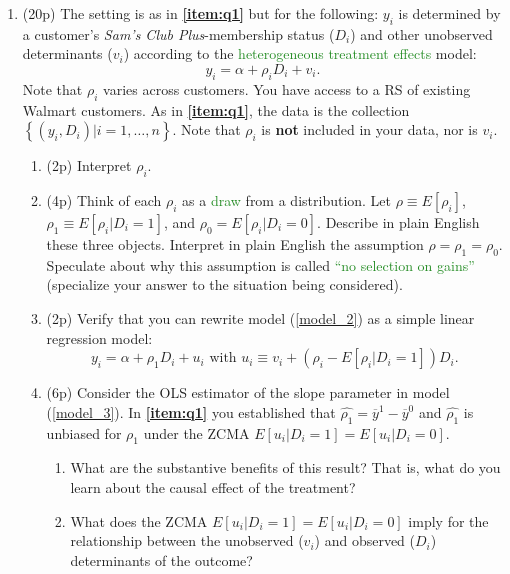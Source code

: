 \documentclass{article}
\begin{document}
\begin{enumerate}[label=\textbf{Q\arabic{enumi}}.,ref=Q\arabic{enumi}, wide=0pt, itemsep=1em, topsep=5pt]
    \item (20p) The setting is as in \textbf{\ref{item:q1}} but for the following: $y_{i}$ is determined by a customer's \textit{Sam's Club Plus}-membership status ($D_{i}$) and other unobserved determinants ($v _{i}$) according to the \textcolor{ForestGreen}{heterogeneous treatment effects} model: \label{item:q3}
    \begin{equation}\label{model_2}
    y_{i}=\alpha +\rho _{i}D_{i}+v_{i}. 
    \end{equation}
Note that $\rho _{i}$ varies across customers. You have access to a RS of existing Walmart customers. As in \textbf{\ref{item:q1}}, the data is the collection $\left\{ \left( y_{i},D_{i}\right) |i=1,\ldots,n\right\} $. Note that $\rho _{i}$ is \textbf{not} included in your data, nor is $v_i$.

    \begin{enumerate}
        \item (2p) Interpret $\rho _{i}$.
        \item (4p) Think of each $\rho _{i}$ as a \textcolor{ForestGreen}{draw} from a distribution. Let $\rho \equiv E\left[ \rho _{i}\right] $, $\rho_1 \equiv E\left[ \rho _{i}|D_{i}=1\right]$, and $\rho_0 = E\left[ \rho _{i}|D_{i}=0\right]$. Describe in plain English these three objects. Interpret in plain English the assumption $\rho=\rho_1=\rho_0 $. Speculate about why this assumption is called \textcolor{ForestGreen}{``no selection on gains''} (specialize your answer to the situation being considered).\label{item:q3-att}
        \item (2p) Verify that you can rewrite model (\ref{model_2}) as a simple linear regression model:
     \begin{equation}\label{model_3}
    y_{i}=\alpha +\rho_1 D_{i}+u_{i} \text{ with } u_i \equiv v_i+(\rho_i-E[\rho_i|D_i=1])D_i. 
    \end{equation}       
        \item (6p) Consider the OLS estimator of the slope parameter in model (\ref{model_3}). In \textbf{\ref{item:q1}} you established that $\widehat{\rho_1 }=\overline{y}^{1}-\overline{y}^{0}$ and $\widehat{\rho_1 }$ is unbiased for $\rho_1$ under the ZCMA $E[u_i|D_i=1]=E[u_i|D_i=0]$. 
        \begin{enumerate}
        \item What are the substantive benefits of this result? That is, what do you learn about the causal effect of the treatment?
        \item What does the ZCMA $E[u_i|D_i=1]=E[u_i|D_i=0]$ imply for the relationship between the unobserved ($v_i$) and observed ($D_i$) determinants of the outcome?
        \end{enumerate}


\end{enumerate}
\end{enumerate}
\end{document}
